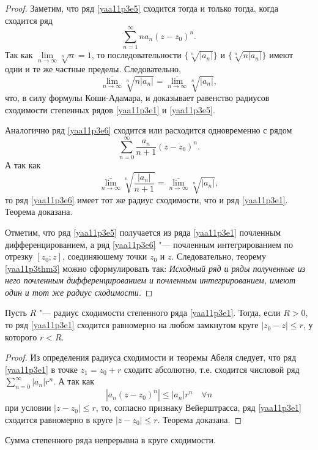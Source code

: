 \begin{proof}
Заметим, что ряд \eqref{yaa11p3e5} сходится тогда и только тогда, когда сходится ряд
$$
\sum\limits_{n=1}^{\infty}na_n(z-z_0)^n.
$$
Так как $\lim\limits_{n\to\infty} \sqrt[n]{n} = 1$, то последовательности $\{\sqrt[n]{|a_n|}\}$ и $\{\sqrt[n]{n|a_n|}\}$ имеют одни и те же частные пределы. Следовательно,
$$
\overline{\lim\limits_{n\to\infty}}\sqrt[n]{n|a_n|}=\overline{\lim\limits_{n\to\infty}}\sqrt[n]{|a_n|},
$$
что, в силу формулы Коши-Адамара, и доказывает равенство радиусов сходимости степенных рядов \eqref{yaa11p3e1} и \eqref{yaa11p3e5}.

Аналогично ряд \eqref{yaa11p3e6} сходится или расходится одновременно с рядом
$$
\sum\limits_{n=0}^{\infty}\frac{a_n}{n+1}(z-z_0)^n.
$$
А так как 
$$
\overline{\lim\limits_{n\to\infty}}\sqrt[n]{\frac{|a_n|}{n+1}}=\overline{\lim\limits_{n\to\infty}}\sqrt[n]{|a_n|},
$$
то ряд \eqref{yaa11p3e6} имеет тот же радиус сходимости, что и ряд \eqref{yaa11p3e1}. Теорема доказана.

Отметим, что ряд \eqref{yaa11p3e5} получается из ряда \eqref{yaa11p3e1} почленным дифференцированием, а ряд \eqref{yaa11p3e6} "--- почленным интегрированием по отрезку $[z_0;z]$, соединяюшему точки $z_0$ и $z$. Следовательно, теорему \eqref{yaa11p3thm3} можно сформулировать так:
\textit{Исходный ряд и ряды полученные из него почленным дифференцированием и почленным интегрированием, имеют один и тот же радиус сходимости.}

\end{proof}

\begin{thm}
Пусть $R$ "--- радиус сходимости степенного ряда \eqref{yaa11p3e1}. Тогда, если $R>0$, то ряд \eqref{yaa11p3e1} сходится равномерно на любом замкнутом круге $|z_0-z|\le r$, у которого $r<R$.
\end{thm}

\begin{proof}
Из определения радиуса сходимости и теоремы Абеля следует, что ряд \eqref{yaa11p3e1} в точке $z_1=z_0+r$ сходитс абсолютно, т.е. сходится числовой ряд $\sum\limits_{n=0}^{\infty} |a_n|r^n$. А так как
$$
|a_n(z-z_0)^n|\le |a_n|r^n \quad \forall n
$$
при условии $|z-z_0|\le r$, то, согласно признаку Вейерштрасса, ряд \eqref{yaa11p3e1} сходится равномерно в круге $|z-z_0|\le r$. Теорема доказана.
\end{proof}

\begin{cons}
Сумма степенного ряда непрерывна в круге сходимости.
\end{cons}

